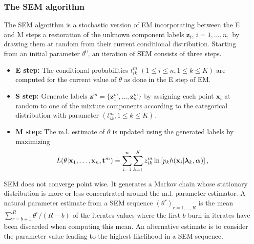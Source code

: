 \documentclass[a4paper,10pt]{article}
\newcommand{\bx}{\mathbf{x}}
\newcommand{\bz}{\mathbf{z}}
\newcommand{\bt}{\mathbf{t}}
\newcommand{\balpha}{\boldsymbol{\alpha}}
\newcommand{\blambda}{\boldsymbol{\lambda}}
\begin{document}
\subsubsection{The SEM algorithm}
The SEM algorithm is a stochastic version of EM incorporating between the E and M steps a
restoration of the unknown component labels $\bz_i$, $i=1,\ldots,n,$ by drawing them at random
from their current conditional distribution. Starting from an initial parameter $\theta^0$, an
iteration of SEM consists of three steps.
\begin{itemize}
\item {\bf E step:} The conditional probabilities $t^m_{ik}$ $(1 \leq i \leq n, 1 \leq k \leq
  K)$ are computed for the current value of $\theta$ as done in the E step of EM.
\item {\bf S step:} Generate labels ${\bz}^m=\{ {\bz}^m_1,...,{\bz}^m_n\}$
  by assigning each point ${\bx}_i$ at random to one of the mixture
  components according to the categorical distribution with parameter $(t^m_{ik}, 1 \leq k \leq K)$.
\item {\bf M step:} The m.l. estimate of $\theta$ is updated using the generated labels
  by maximizing
\begin{equation} \label{eq:mStepSEM}
  L(\theta| {\bx}_{1},\ldots,{\bx}_{n}, {\bt}^m)
    =\sum_{i=1}^{n}\sum_{k=1}^{K} z_{ik}^m \ln \left [p_{k} h({\bf x}_{i}|\blambda_{k},\balpha)\right],
\end{equation}

\end{itemize}

SEM does not converge point wise.  It generates a Markov chain whose stationary distribution is
more or less concentrated around the m.l. parameter estimator. A natural parameter estimate from
a SEM sequence $(\theta^r)_{r=1, \ldots,R}$ is the mean $\sum_{r=b+1}^R \theta^r/(R-b)$ of the
iterates values where the first $b$ burn-in iterates have been discarded when computing this
mean.  An alternative estimate is to consider the parameter value leading to the highest
likelihood in a SEM sequence.
\end{document}
